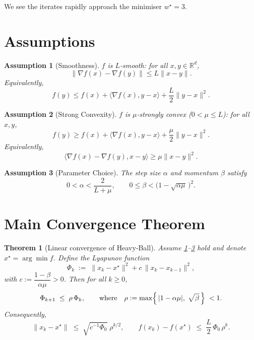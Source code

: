 \documentclass{article}
\newtheorem{theorem}{Theorem}
\newtheorem{assumption}{Assumption}
\begin{document}
We see the iterates rapidly approach the minimiser $w^{\star}=3$.

\newpage
\section*{Assumptions}
\begin{assumption}[Smoothness]\label{ass:smooth}
$f$ is $L$‑smooth: for all $x,y\in\mathbb{R}^{d}$,
\[
\|\nabla f(x)-\nabla f(y)\|\le L\|x-y\|.
\]
Equivalently,
\[
f(y)\le f(x)+\langle\nabla f(x),y-x\rangle+\frac{L}{2}\|y-x\|^{2}.
\]
\end{assumption}

\begin{assumption}[Strong Convexity]\label{ass:strong}
$f$ is $\mu$‑strongly convex ($0<\mu\le L$): for all $x,y$,
\[
f(y)\ge f(x)+\langle\nabla f(x),y-x\rangle+\frac{\mu}{2}\|y-x\|^{2}.
\]
Equivalently,
\[
\langle\nabla f(x)-\nabla f(y),x-y\rangle\ge\mu\|x-y\|^{2}.
\]
\end{assumption}

\begin{assumption}[Parameter Choice]\label{ass:param}
The step size $\alpha$ and momentum $\beta$ satisfy
\[
0<\alpha<\frac{2}{L+\mu},\qquad
0\le\beta<\bigl(1-\sqrt{\alpha\mu}\,\bigr)^{2}.
\]
\end{assumption}

\section*{Main Convergence Theorem}
\begin{theorem}[Linear convergence of Heavy‑Ball]\label{thm:linear}
Assume \ref{ass:smooth}–\ref{ass:param} hold and denote $x^{\star}=\arg\min f$.  
Define the Lyapunov function
\[
\Phi_{k}\;:=\; \|x_{k}-x^{\star}\|^{2}+c\,\|x_{k}-x_{k-1}\|^{2},
\]
with $c:=\dfrac{1-\beta}{\alpha\mu}>0$.  
Then for all $k\ge 0$,
\[
\Phi_{k+1}\;\le\;\rho\,\Phi_{k},
\qquad\text{where}\quad
\rho:=\max\Bigl\{\,|1-\alpha\mu|,\;\sqrt{\beta}\,\Bigr\}\;<1.
\]
Consequently,
\[
\|x_{k}-x^{\star}\|\;\le\;\sqrt{c^{-1}\Phi_{0}}\;\rho^{k/2},
\qquad
f(x_{k})-f(x^{\star})\;\le\;\frac{L}{2}\,\Phi_{0}\,\rho^{k}.
\]
\end{theorem}
\end{document}
